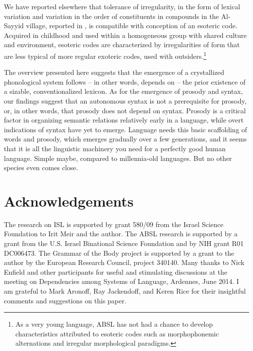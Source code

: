 \documentclass[output=paper]{langsci/langscibook}
\begin{document}
 We have reported elsewhere that tolerance of irregularity, in the form of lexical variation and variation in the order of constituents in compounds in the Al-Sayyid village, reported in \citet{Meir2010}, is compatible with  conception of an esoteric code.  Acquired in childhood and used within a homogeneous group with shared culture and environment, esoteric codes are characterized by irregularities of form that are less typical of more regular exoteric codes, used with outsiders.\footnote{As a very young language, ABSL has not had a chance to develop characteristics attributed to esoteric codes such as morphophonemic alternations and irregular morphological paradigms.  } 

The overview presented here suggests that the emergence of a crystallized phonological system follows -- in other words, depends on -- the prior existence of a sizable, conventionalized lexicon.  As for the emergence of prosody and syntax, our findings suggest that an autonomous syntax is not a prerequisite for prosody, or, in other words, that prosody does not depend on syntax.  Prosody is a critical factor in organizing semantic relations relatively early in a language, while overt indications of syntax have yet to emerge.  Language needs this basic scaffolding of words and prosody, which emerges gradually over a few generations, and it seems that it is all the linguistic machinery you need for a perfectly good human language. %
Simple maybe, compared to millennia-old languages.  But no other species even comes close.  

\section*{Acknowledgements}
The research on ISL is supported by grant 580/09 from the Israel Science Foundation to Irit Meir and the author. The ABSL research is supported by a grant from the U.S. Israel Binational Science Foundation and by NIH grant R01 DC006473.  The Grammar of the Body project is supported by a grant to the author by the European Research Council, project 340140.  Many thanks to Nick Enfield and other participants for useful and stimulating discussions at the meeting on Dependencies among Systems of Language, Ardennes, June 2014.  I am grateful to Mark Aronoff, Ray Jackendoff, and Keren Rice for their insightful comments and suggestions on this paper. 

{\sloppy
\printbibliography[heading=subbibliography,notkeyword=this]
}
\end{document}

